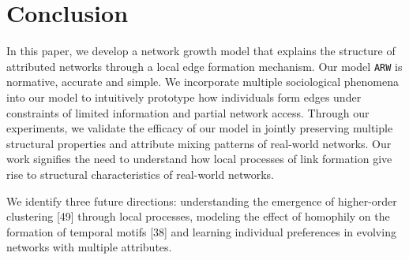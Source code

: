 \vspace{-4pt}
\section{Conclusion}
\label{sec:Conclusion}
In this paper, we develop a network growth model that explains the
structure of attributed networks through a local edge formation mechanism. Our
model \texttt{ARW} is normative, accurate and simple. We incorporate multiple
sociological phenomena into our model to intuitively prototype how individuals
form edges under constraints of limited information and partial network access.
Through our experiments, we validate the efficacy of our model in jointly preserving
multiple structural properties and attribute mixing patterns of real-world networks.
Our work signifies the need to understand how local processes of link formation
give rise to structural characteristics of real-world networks.


We identify three future directions: understanding the emergence of higher-order clustering [49]
through local processes, modeling the effect of homophily on the formation of temporal motifs [38]
and learning individual preferences in evolving networks with multiple attributes.

